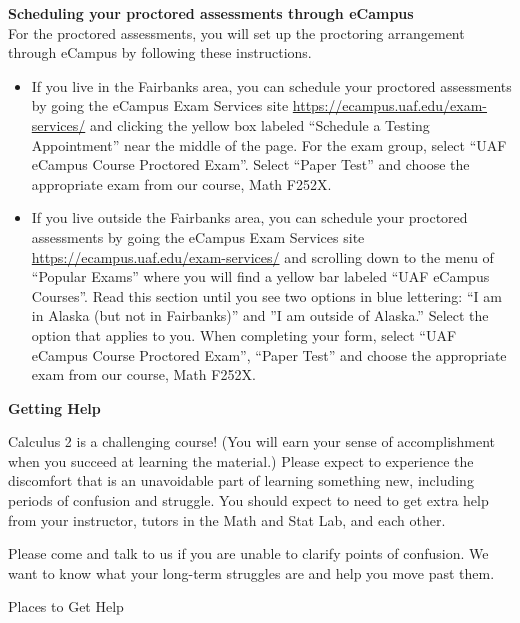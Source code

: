 \documentclass[12pt]{article}
\renewcommand{\emph}[1]{\textsf{\textbf{#1}}}
\newcommand{\localhead}[1]{\par\smallskip\textbf{#1} \smallskip\nobreak\\}%
\def\heading#1{\localhead{\large\emph{#1}}}
\begin{document}
\heading{Scheduling your proctored assessments through eCampus}
For the proctored assessments, you will set up the proctoring arrangement through eCampus by following these instructions.
\begin{itemize}
\item If you live in the Fairbanks area, you can schedule your proctored assessments by going
the eCampus Exam Services site \href{https://ecampus.uaf.edu/exam-services/}{https://ecampus.uaf.edu/exam-services/} and clicking
the yellow box labeled “Schedule a Testing Appointment” near the middle of the page.
For the exam group, select “UAF eCampus Course Proctored Exam”. Select “Paper Test”
and choose the appropriate exam from our course, Math F252X.
\item If you live outside the Fairbanks area, you can schedule your proctored assessments by
going the eCampus Exam Services site \href{https://ecampus.uaf.edu/exam-services/}{https://ecampus.uaf.edu/exam-services/} and
scrolling down to the menu of “Popular Exams” where you will find a yellow bar labeled
“UAF eCampus Courses”. Read this section until you see two options in blue lettering: “I
am in Alaska (but not in Fairbanks)” and ”I am outside of Alaska.” Select the option that
applies to you. When completing your form, select “UAF eCampus Course Proctored
Exam”, “Paper Test” and choose the appropriate exam from our course, Math F252X.
\end{itemize}

\heading{Getting Help}
\vspace*{-.3in}

Calculus 2 is a challenging course!  (You will earn your sense of accomplishment when you succeed at learning the material.)  Please expect to experience the discomfort that is an unavoidable part of learning something new, including periods of confusion and struggle. You should expect to need to get extra help from your instructor, tutors in the Math and Stat Lab, and each other. 

Please come and talk to us if you are unable to clarify points of confusion. We want to know what your long-term struggles are and help you move past them.

Places to Get Help
\end{document}
